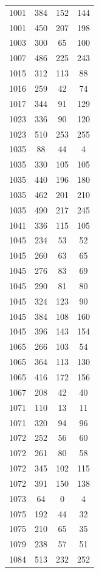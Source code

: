 \documentclass[12pt]{amsproc} %
\theoremstyle{definition}\newtheorem{defn}[thm]{Definition}
\theoremstyle{definition}\newtheorem{rem}[thm]{Remark}
\theoremstyle{definition}\newtheorem{ex}[thm]{Example}
\begin{document}
\begin{table}[ht]
    \begin{minipage}{0.25\textwidth}
        \centering
        \begin{tabular}{c|c|c|c}  
      1001&384&152&144\\ 
      1001&450&207&198\\ 
      1003&300&65&100\\
      1007&486&225&243\\ 
      1015&312&113&88\\ 
      1016&259&42&74\\ 
      1017&344&91&129\\ 
      1023&336&90&120\\ 
      1023&510&253&255\\ 
      1035&88&44&4\\ 
      1035&330&105&105\\ 
      1035&440&196&180\\ 
      1035&462&201&210\\ 
      1035&490&217&245\\ 
      1041&336&115&105\\ 
      1045&234&53&52\\ 
      1045&260&63&65\\ 
      1045&276&83&69\\
      1045&290&81&80\\ 
      1045&324&123&90\\ 
      1045&384&108&160\\ 
      1045&396&143&154\\ 
      1065&266&103&54\\ 
      1065&364&113&130\\ 
      1065&416&172&156\\ 
      1067&208&42&40\\ 
      1071&110&13&11\\ 
      1071&320&94&96\\ 
      1072&252&56&60\\ 
      1072&261&80&58\\ 
      1072&345&102&115\\ 
      1072&391&150&138\\ 
      1073&64&0&4\\ 
      1075&192&44&32\\ 
      1075&210&65&35\\ 
      1079&238&57&51\\ 
      1084&513&232&252\\ 

\end{tabular}
\end{minipage}
\end{table}
\end{document}
